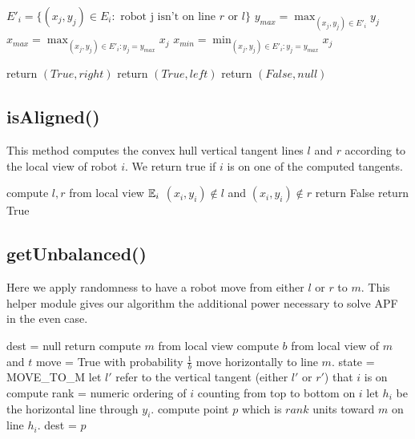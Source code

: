 \documentclass[preprint,10pt]{elsarticle}
\begin{document}
\begin{algorithm}[H]
\begin{algorithmic}[1]
	\State $E'_i = \{ (x_j, y_j) \in E_i : \text{ robot j isn't on line } r \text{ or } l\}$
	\State $y_{max} = \max_{(x_j, y_j) \in E'_i}{y_j}$ 
	\State $x_{max} = \max_{(x_j, y_j) \in E'_i : y_j = y_{max} }{x_j}$ 
	\State $x_{min} = \min_{(x_j, y_j) \in E'_i : y_j = y_{max} }{x_j}$ 

		\State return $(True, right)$
		\State return $(True, left)$
	\Else
		\State return $(False, null)$
	\EndIf

\EndProcedure
\end{algorithmic}
\end{algorithm}

\subsection{isAligned()} 

This method computes the convex hull vertical tangent lines $l$ and $r$ according
to the local view of robot $i$. We return true if $i$ is on one of the 
computed tangents.
\begin{algorithm}[H]
\begin{algorithmic}[1]
	\State compute $l,r$ from local view $\mathbb{E}_i$
	\If $(x_i, y_i) \notin  l$ and $(x_i, y_i) \notin r$
		\State return False
	\Else 
		\State return True
	\EndIf
\EndProcedure
\end{algorithmic}
\end{algorithm}

\subsection{getUnbalanced()} 
Here we apply randomness to have a robot move from either $l$ or $r$ to $m$.
This helper module gives our algorithm the additional power necessary to 
solve APF in the even case.
\begin{algorithm}[H]
\begin{algorithmic}[1]
		\State dest = null
		\State return
	\EndIf
	\State compute $m$ from local view
	\State compute $b$ from local view of $m$ and $t$
	\State move = True with probability $\frac{1}{b}$ \Comment move horizontally to line $m$. 
		\State state = MOVE\_TO\_M
		\State let $l'$ refer to the vertical tangent (either $l'$ or $r'$) that $i$ is on
		\State compute rank = numeric ordering of $i$ counting from top to bottom on $i$
		\State let $h_i$ be the horizontal line through $y_i$. 
		\State compute point $p$ which is $rank$ units toward $m$ on line $h_i$.
		\State dest = $p$
	\EndIf


\EndProcedure
\end{algorithmic}
\end{algorithm}
\end{document}
